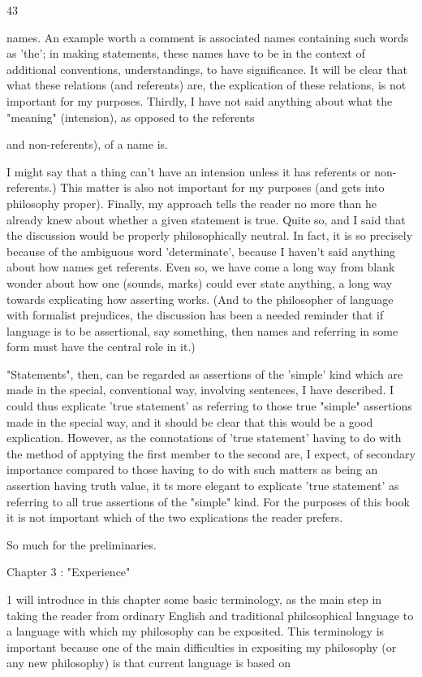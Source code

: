 \documentclass[10pt,twoside]{memoir}
\begin{document}
\begin{enumerate}
{{{{{{{43 


names. An example worth a comment is associated names containing such 
words as 'the'; in making statements, these names have to be in the context 
of additional conventions, understandings, to have significance. It will be 
clear that what these relations (and referents) are, the explication of these 
relations, is not important for my purposes. Thirdly, I have not said anything 
about what the "meaning" (intension), as opposed to the referents {and 
non-referents), of a name is. {I might say that a thing can't have an intension 
unless it has referents or non-referents.) This matter is also not important for 
my purposes (and gets into philosophy proper). Finally, my approach tells 
the reader no more than he already knew about whether a given statement is 
true. Quite so, and I said that the discussion would be properly 
philosophically neutral. In fact, it is so precisely because of the ambiguous 
word 'determinate', because I haven't said anything about how names get 
referents. Even so, we have come a long way from blank wonder about how 
one (sounds, marks) could ever state anything, a long way towards 
explicating how asserting works. (And to the philosopher of language with 
formalist prejudices, the discussion has been a needed reminder that if 
language is to be assertional, say something, then names and referring in 
some form must have the central role in it.) 

"Statements", then, can be regarded as assertions of the 'simple' kind 
which are made in the special, conventional way, involving sentences, I have 
described. I could thus explicate 'true statement' as referring to those true 
"simple" assertions made in the special way, and it should be clear that this 
would be a good explication. However, as the connotations of 'true 
statement' having to do with the method of apptying the first member to the 
second are, I expect, of secondary importance compared to those having to 
do with such matters as being an assertion having truth value, it ts more 
elegant to explicate 'true statement' as referring to all true assertions of the 
"simple" kind. For the purposes of this book it is not important which of 
the two explications the reader prefers. 

So much for the preliminaries. 


Chapter 3 : "Experience" 


1 will introduce in this chapter some basic terminology, as the main step 
in taking the reader from ordinary English and traditional philosophical 
language to a language with which my philosophy can be exposited. This 
terminology is important because one of the main difficulties in expositing 
my philosophy (or any new philosophy) is that current language is based on 


}}}}}}}}}
\end{enumerate}
\end{document}
